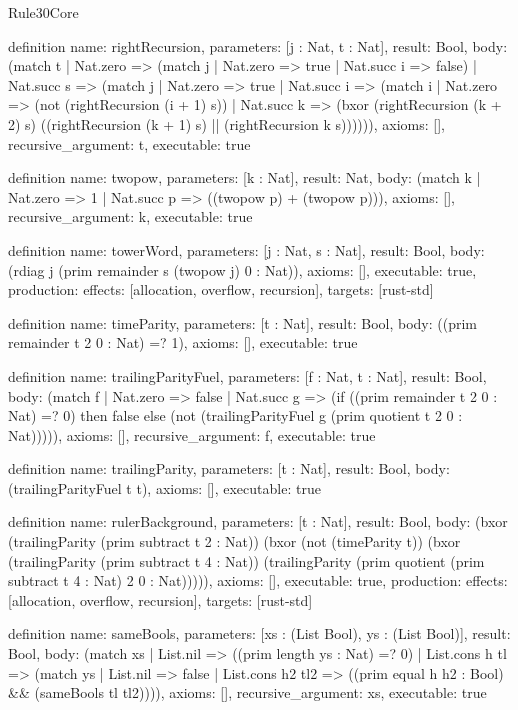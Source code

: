 \begin{lexlean}{Rule30Core}
\begin{semanticmodule}
definition{
  name: rightRecursion,
  parameters: [j : Nat, t : Nat],
  result: Bool,
  body: (match t
    | Nat.zero => (match j
    | Nat.zero => true
    | Nat.succ i => false)
    | Nat.succ s => (match j
    | Nat.zero => true
    | Nat.succ i => (match i
    | Nat.zero => (not (rightRecursion (i + 1) s))
    | Nat.succ k => (bxor (rightRecursion (k + 2) s) ((rightRecursion (k + 1) s) || (rightRecursion k s)))))),
  axioms: [],
  recursive_argument: t,
  executable: true
}

definition{
  name: twopow,
  parameters: [k : Nat],
  result: Nat,
  body: (match k
    | Nat.zero => 1
    | Nat.succ p => ((twopow p) + (twopow p))),
  axioms: [],
  recursive_argument: k,
  executable: true
}

definition{
  name: towerWord,
  parameters: [j : Nat, s : Nat],
  result: Bool,
  body: (rdiag j (prim remainder s (twopow j) 0 : Nat)),
  axioms: [],
  executable: true,
  production: {effects: [allocation, overflow, recursion], targets: [rust-std]}
}

definition{
  name: timeParity,
  parameters: [t : Nat],
  result: Bool,
  body: ((prim remainder t 2 0 : Nat) =? 1),
  axioms: [],
  executable: true
}

definition{
  name: trailingParityFuel,
  parameters: [f : Nat, t : Nat],
  result: Bool,
  body: (match f
    | Nat.zero => false
    | Nat.succ g => (if ((prim remainder t 2 0 : Nat) =? 0) then false else (not (trailingParityFuel g (prim quotient t 2 0 : Nat))))),
  axioms: [],
  recursive_argument: f,
  executable: true
}

definition{
  name: trailingParity,
  parameters: [t : Nat],
  result: Bool,
  body: (trailingParityFuel t t),
  axioms: [],
  executable: true
}

definition{
  name: rulerBackground,
  parameters: [t : Nat],
  result: Bool,
  body: (bxor (trailingParity (prim subtract t 2 : Nat)) (bxor (not (timeParity t)) (bxor (trailingParity (prim subtract t 4 : Nat)) (trailingParity (prim quotient (prim subtract t 4 : Nat) 2 0 : Nat))))),
  axioms: [],
  executable: true,
  production: {effects: [allocation, overflow, recursion], targets: [rust-std]}
}

definition{
  name: sameBools,
  parameters: [xs : (List Bool), ys : (List Bool)],
  result: Bool,
  body: (match xs
    | List.nil => ((prim length ys : Nat) =? 0)
    | List.cons h tl => (match ys
    | List.nil => false
    | List.cons h2 tl2 => ((prim equal h h2 : Bool) && (sameBools tl tl2)))),
  axioms: [],
  recursive_argument: xs,
  executable: true
}


\end{semanticmodule}
\end{lexlean}
